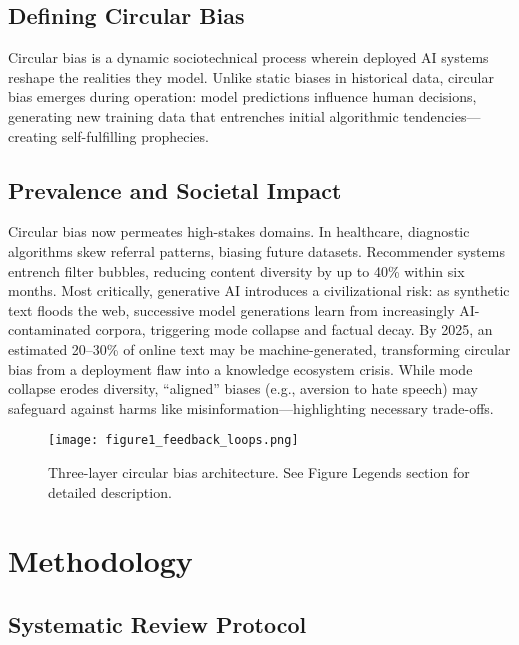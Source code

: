 \documentclass[11pt]{article}
\begin{document}
\subsection{Defining Circular Bias}

Circular bias is a dynamic sociotechnical process wherein deployed AI systems reshape the realities they model. Unlike static biases in historical data, circular bias emerges during operation: model predictions influence human decisions, generating new training data that entrenches initial algorithmic tendencies—creating self-fulfilling prophecies.

\subsection{Prevalence and Societal Impact}

Circular bias now permeates high-stakes domains. In healthcare, diagnostic algorithms skew referral patterns, biasing future datasets. Recommender systems entrench filter bubbles, reducing content diversity by up to 40\% within six months. Most critically, generative AI introduces a civilizational risk: as synthetic text floods the web, successive model generations learn from increasingly AI-contaminated corpora, triggering mode collapse and factual decay. By 2025, an estimated 20–30\% of online text may be machine-generated, transforming circular bias from a deployment flaw into a knowledge ecosystem crisis. While mode collapse erodes diversity, ``aligned'' biases (e.g., aversion to hate speech) may safeguard against harms like misinformation—highlighting necessary trade-offs\cite{ferrara2023}.

\begin{figure}[H]
\centering
\texttt{[image: figure1\_feedback\_loops.png]}
\caption{Three-layer circular bias architecture. See Figure Legends section for detailed description.}
\label{fig:architecture}
\end{figure}

\section{Methodology}

\subsection{Systematic Review Protocol}
\end{document}
